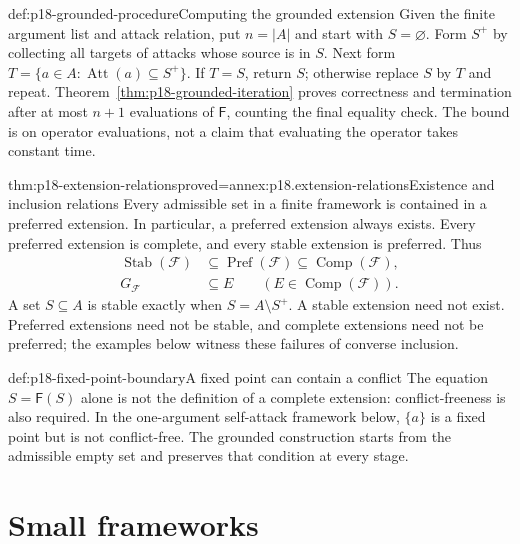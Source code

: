 \begin{hbmethod}{def:p18-grounded-procedure}{Computing the grounded extension}
Given the finite argument list and attack relation, put \(n=|A|\) and
start with \(S=\varnothing\).
Form \(S^+\) by collecting all targets of attacks whose source is in
\(S\). Next form
\(T=\{a\in A:\operatorname{Att}(a)\subseteq S^+\}\).
If \(T=S\), return \(S\); otherwise replace \(S\) by \(T\)
and repeat. Theorem~\ref{thm:p18-grounded-iteration} proves correctness and
termination after at most \(n+1\) evaluations of \(\mathsf F\), counting
the final equality check. The bound is on operator evaluations, not a claim
that evaluating the operator takes constant time.
\end{hbmethod}

\begin{hbtheorem}{thm:p18-extension-relations}{proved=annex:p18.extension-relations}{Existence and inclusion relations}
Every admissible set in a finite framework is contained in a preferred
extension. In particular, a preferred extension always exists.
Every preferred extension is complete, and every stable extension is
preferred. Thus
\[
\begin{aligned}
 \operatorname{Stab}(\mathcal F)
 &\subseteq\operatorname{Pref}(\mathcal F)
  \subseteq\operatorname{Comp}(\mathcal F),\\
 G_{\mathcal F}&\subseteq E\qquad
   (E\in\operatorname{Comp}(\mathcal F)).
\end{aligned}
\]
A set \(S\subseteq A\) is stable exactly when
\(S=A\setminus S^+\). A stable extension need not exist. Preferred
extensions need not be stable, and complete extensions need not be preferred;
the examples below witness these failures of converse inclusion.
\end{hbtheorem}

\begin{hbwarning}{def:p18-fixed-point-boundary}{A fixed point can contain a conflict}
The equation \(S=\mathsf F(S)\) alone is not the definition of a
complete extension: conflict-freeness is also required. In the one-argument
self-attack framework below, \(\{a\}\) is a fixed point but is not
conflict-free. The grounded construction starts from the admissible empty
set and preserves that condition at every stage.
\end{hbwarning}

\section{Small frameworks}
\label{sec:p18-small-frameworks}

